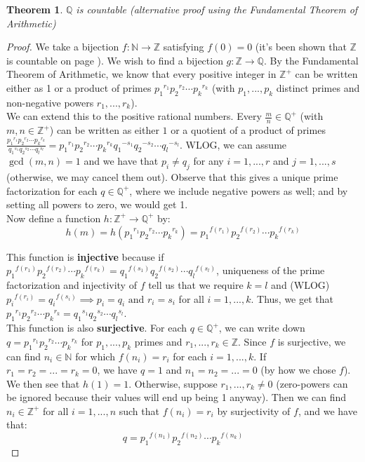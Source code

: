 \documentclass[12pt, a4paper, titlepage, twoside]{article}
\newcommand*{\N}{\mathbb{N}}
\newcommand*{\Z}{\mathbb{Z}}
\newcommand*{\Q}{\mathbb{Q}}
\newtheorem*{theorem*}{Theorem}
\begin{document}
	\begin{pf}
		\label{apA:q-count-fta}
		\begin{theorem*}
			$\Q$ is countable (alternative proof using the Fundamental Theorem of Arithmetic)
		\end{theorem*}

		\tcbline		
		
		\begin{proof}
			We take a bijection $f : \N \to \Z$ satisfying $f(0) = 0$ (it's been shown that $\Z$ is countable on page \pageref*{pf:z-count}).
			We wish to find a bijection $g : \Z \to \Q$. By the Fundamental Theorem of Arithmetic, we know that every positive
			integer in $\Z^+$ can be written either as 1 or a product of primes ${p_1}^{r_1} {p_2}^{r_2} \cdots {p_k}^{r_k}$ (with $p_1, ..., p_k$ 
			distinct primes and non-negative powers $r_1, ..., r_k$).\\
			
			We can extend this to the positive rational numbers. Every $\frac{m}{n} \in \Q^+$ (with $m,n \in \Z^+$) can be
			written as either $1$ or a quotient of a product of primes $\frac{{p_1}^{r_1} {p_2}^{r_2} \cdots {p_k}^{r_k}}
			{{q_1}^{s_1} {q_2}^{s_2} \cdots {q_l}^{s_l}} = {p_1}^{r_1} {p_2}^{r_2} \cdots {p_k}^{r_k} {q_1}^{-s_1} {q_2}^{-s_2} \cdots {q_l}^{-s_l}$. 
			WLOG, we can
			assume $\gcd(m,n) = 1$ and we have that $p_i \neq q_j$ for any $i = 1, ..., r$ and $j = 1, ..., s$ (otherwise, we may cancel them out).
			Observe that this gives a unique prime factorization for each $q \in \Q^+$, where we include negative powers as well; and
			by setting all powers to zero, we would get 1.\\
			
			Now define a function $h : \Z^+ \to \Q^+$ by:
			\[ h(m) = h({p_1}^{r_1} {p_2}^{r_2} \cdots {p_k}^{r_k}) = {p_1}^{f(r_1)}{p_2}^{f(r_2)} \cdots {p_k}^{f(r_k)} \]
			
			This function is \textbf{injective} because if ${p_1}^{f(r_1)}{p_2}^{f(r_2)} \cdots {p_k}^{f(r_k)} = {q_1}^{f(s_1)}{q_2}^{f(s_2)} \cdots 
			{q_l}^{f(s_l)}$, uniqueness of the prime factorization and injectivity of $f$ tell us that we require $k=l$ and (WLOG) 
			${p_i}^{f(r_i)} = {q_i}^{f(s_i)} \implies p_i = q_i \text{ and } r_i = s_i$ for all $i = 1, ..., k$. Thus, we get that 
			${p_1}^{r_1} {p_2}^{r_2} \cdots {p_k}^{r_k} = {q_1}^{s_1} {q_2}^{s_2} \cdots {q_l}^{s_l}$.\\
			
			This function is also \textbf{surjective}. For each $q \in \Q^+$, we can write down $q = {p_1}^{r_1} {p_2}^{r_2} \cdots {p_k}^{r_k}$
			for $p_1, ..., p_k$ primes and $r_1, ..., r_k \in \Z$. Since $f$ is surjective, we can find $n_i \in \N$ for which $f(n_i) = r_i$ for each
			$i = 1, ..., k$. If $r_1 = r_2 = ... = r_k = 0$, we have $q = 1$ and $n_1 = n_2 = ... = 0$ (by how we chose $f$). We then see that
			$h(1) = 1$. Otherwise, suppose $r_1, ..., r_k \neq 0$ (zero-powers can be ignored because their values will end up being 1 anyway).
			Then we can find $n_i \in \Z^+$ for all $i = 1, ..., n$ such that $f(n_i) = r_i$ by surjectivity of $f$, and we have that:
			\[ q = {p_1}^{f(n_1)}{p_2}^{f(n_2)} \cdots {p_k}^{f(n_k)} \]
			

\end{proof}
\end{pf}
\end{document}
